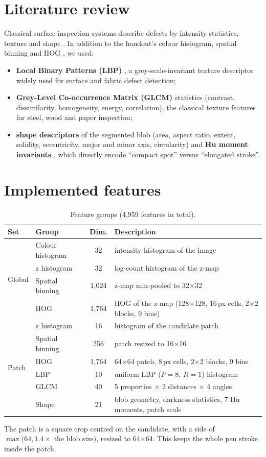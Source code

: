 \documentclass[11pt,a4paper]{report}
\begin{document}
\section{Literature review}
Classical surface-inspection systems describe defects by intensity statistics, texture and
shape \cite{xie,neogi}. In addition to the handout's colour histogram, spatial binning
\cite{udacity} and HOG \cite{hog}, we used:
\begin{itemize}
  \item \textbf{Local Binary Patterns (LBP)} \cite{lbp}, a grey-scale-invariant texture
        descriptor widely used for surface and fabric defect detection;
  \item \textbf{Grey-Level Co-occurrence Matrix (GLCM)} statistics \cite{haralick}
        (contrast, dissimilarity, homogeneity, energy, correlation), the classical texture
        features for steel, wood and paper inspection;
  \item \textbf{shape descriptors} of the segmented blob (area, aspect ratio, extent,
        solidity, eccentricity, major and minor axis, circularity) and \textbf{Hu moment
        invariants} \cite{hu}, which directly encode ``compact spot'' versus ``elongated
        stroke''.
\end{itemize}

\section{Implemented features}
\begin{table}[H]
\centering
\caption{Feature groups (4,959 features in total).}
\label{tab:feat}
\begin{tabularx}{\textwidth}{llcX}
\toprule
Set & Group & Dim. & Description\\
\midrule
\multirow{4}{*}{Global}
 & Colour histogram & 32 & intensity histogram of the image\\
 & z histogram & 32 & log-count histogram of the z-map\\
 & Spatial binning & 1,024 & z-map min-pooled to 32$\times$32\\
 & HOG & 1,764 & HOG of the z-map (128$\times$128, 16\,px cells, 2$\times$2 blocks, 9 bins)\\
\midrule
\multirow{6}{*}{Patch}
 & z histogram & 16 & histogram of the candidate patch\\
 & Spatial binning & 256 & patch resized to 16$\times$16\\
 & HOG & 1,764 & 64$\times$64 patch, 8\,px cells, 2$\times$2 blocks, 9 bins\\
 & LBP & 10 & uniform LBP ($P=8$, $R=1$) histogram\\
 & GLCM & 40 & 5 properties $\times$ 2 distances $\times$ 4 angles\\
 & Shape & 21 & blob geometry, darkness statistics, 7 Hu moments, patch scale\\
\bottomrule
\end{tabularx}
\end{table}
\noindent The patch is a square crop centred on the candidate, with a side of
$\max(64, 1.4\times$ the blob size$)$, resized to 64$\times$64. This keeps the whole pen
stroke inside the patch.
\end{document}
